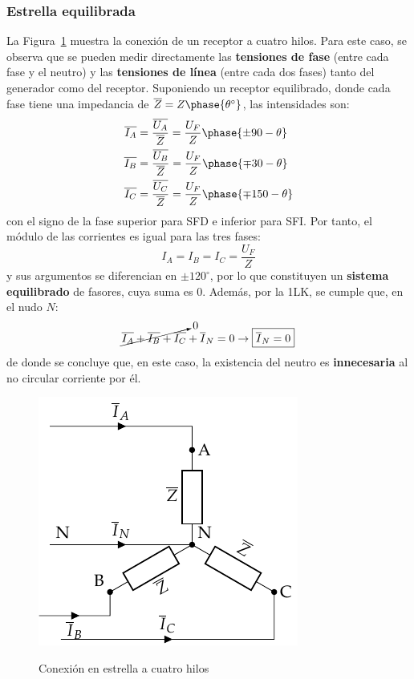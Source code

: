 	\subsubsection{Estrella equilibrada}
	La Figura~\ref{fig.conexion_estrella_4} muestra la conexión de un receptor a cuatro hilos. Para este caso, se observa que se pueden medir directamente las \textbf{tensiones de fase} (entre cada fase y el neutro) y las \textbf{tensiones de línea} (entre cada dos fases) tanto del generador como del receptor. Suponiendo un receptor equilibrado, donde cada fase tiene una impedancia de $\overline{Z}=Z\phase{\theta^\circ}$, las intensidades son:
	\begin{align*}
      \overline{I_A} &= \dfrac{\overline{U_A}}{\overline{Z}} = \dfrac{U_F}{Z}\phase{\pm 90 - \theta} \\
      \overline{I_B} &= \frac{\overline{U_B}}{\overline{Z}} = \frac{U_F}{Z}\phase{{\mp 30} - \theta}\\
      \overline{I_C} &= \frac{\overline{U_C}}{\overline{Z}} = \frac{U_F}{Z}\phase{{\mp 150} - \theta}
    \end{align*}
    con el signo de la fase superior para SFD e inferior para SFI. Por tanto, el módulo de las corrientes es igual para las tres fases: 
    \begin{equation}
        \boxed{I_A = I_B = I_C = \dfrac{U_F}{Z}}
    \end{equation}
    y sus argumentos se diferencian en $\pm120^\circ$, por lo que constituyen un \textbf{sistema equilibrado} de fasores, cuya suma es 0. Además, por la 1LK, se cumple que, en el nudo $N$: 
    \begin{equation}
        \cancelto{0}{\overline{I_A}  + \overline{I_B} + \overline{I_C}} + \overline{I}_N = 0\rightarrow \boxed{\overline{I}_N = 0}
    \end{equation}
    de donde se concluye que, en este caso, la existencia del neutro es \textbf{innecesaria} al no circular corriente por él. 
	\begin{figure}[H]
		\centering
		{\includegraphics{../figs/EstrellaEquilibrado_Receptor.pdf}}
		\caption{Conexión en estrella a cuatro hilos}
		\label{fig.conexion_estrella_4}
	\end{figure}
	
